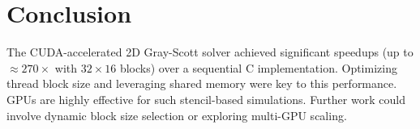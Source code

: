 \documentclass[9pt]{IEEEtran} %
\begin{document}
\section{Conclusion}
\label{sec:conclusion}

The CUDA-accelerated 2D Gray-Scott solver achieved significant speedups (up to $\approx 270\times$ with $32 \times 16$ blocks) over a sequential C implementation. 
Optimizing thread block size and leveraging shared memory were key to this performance. GPUs are highly effective 
for such stencil-based simulations. Further work could involve dynamic block size selection or exploring multi-GPU scaling.
\end{document}
